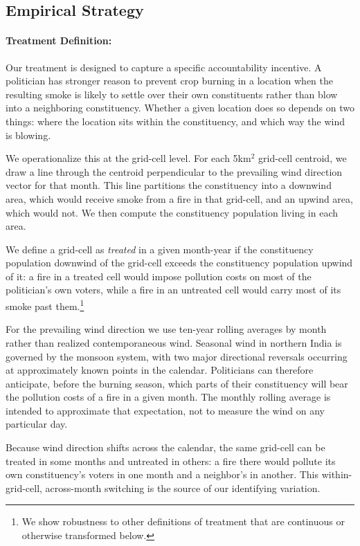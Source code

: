 \documentclass[12pt]{article}
\begin{document}
\subsection{Empirical Strategy}\label{ssec:empirical1}


\paragraph{Treatment Definition:}

Our treatment is designed to capture a specific accountability incentive. A politician has stronger reason to prevent crop burning in a location when the resulting smoke is likely to settle over their own constituents rather than blow into a neighboring constituency. Whether a given location does so depends on two things: where the location sits within the constituency, and which way the wind is blowing.

We operationalize this at the grid-cell level. For each 5km$^2$ grid-cell centroid, we draw a line through the centroid perpendicular to the prevailing wind direction vector for that month. This line partitions the constituency into a downwind area, which would receive smoke from a fire in that grid-cell, and an upwind area, which would not. We then compute the constituency population living in each area. 

We define a grid-cell as \textit{treated} in a given month-year if the constituency population downwind of the grid-cell exceeds the constituency population upwind of it: a fire in a treated cell would impose pollution costs on most of the politician's own voters, while a fire in an untreated cell would carry most of its smoke past them.\footnote{We show robustness to other definitions of treatment that are continuous or otherwise transformed below.}

For the prevailing wind direction we use ten-year rolling averages by month rather than realized contemporaneous wind. Seasonal wind in northern India is governed by the monsoon system, with two major directional reversals occurring at approximately known points in the calendar. Politicians can therefore anticipate, before the burning season, which parts of their constituency will bear the pollution costs of a fire in a given month. The monthly rolling average is intended to approximate that expectation, not to measure the wind on any particular day.

Because wind direction shifts across the calendar, the same grid-cell can be treated in some months and untreated in others: a fire there would pollute its own constituency's voters in one month and a neighbor's in another. This within-grid-cell, across-month switching is the source of our identifying variation.
\end{document}
